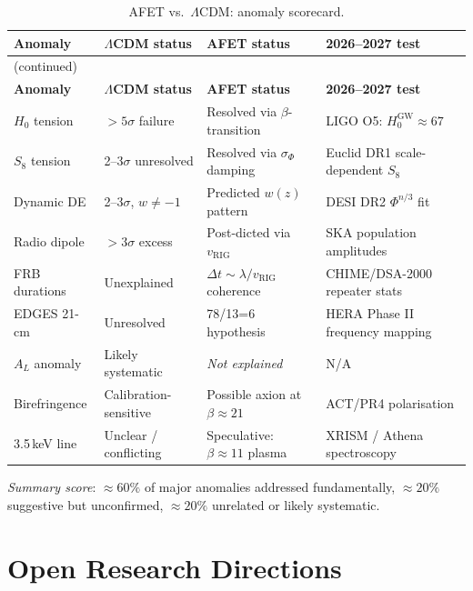 \documentclass[12pt,a4paper]{article}
\theoremstyle{definition}
\newcommand{\sigphi}{\sigma_{\Phi}}
\newcommand{\vrig}{v_{\mathrm{RIG}}}
\newcommand{\PhiAFET}{\Phi}      %
\begin{document}
\begin{longtable}{p{2.4cm}p{2.8cm}p{3.5cm}p{2.8cm}}
\caption{AFET vs.\ $\Lambda$CDM: anomaly scorecard.}
\label{tab:scorecard}\\
\toprule
\textbf{Anomaly} & \textbf{$\Lambda$CDM status} & \textbf{AFET status} &
\textbf{2026--2027 test} \\
\midrule
\endfirsthead
\multicolumn{4}{l}{\small(continued)}\\
\toprule
\textbf{Anomaly} & \textbf{$\Lambda$CDM status} & \textbf{AFET status} &
\textbf{2026--2027 test} \\
\midrule
\endhead
$H_0$ tension & $>5\sigma$ failure &
  \textcolor{confirmgreen}{Resolved via $\beta$-transition} &
  LIGO O5: $H_0^{\mathrm{GW}} \approx 67$ \\[4pt]
$S_8$ tension & 2--3$\sigma$ unresolved &
  \textcolor{confirmgreen}{Resolved via $\sigphi$ damping} &
  Euclid DR1 scale-dependent $S_8$ \\[4pt]
Dynamic DE & 2--3$\sigma$, $w\neq-1$ &
  \textcolor{hypothesisgray}{Predicted $w(z)$ pattern} &
  DESI DR2 $\PhiAFET^{n/3}$ fit \\[4pt]
Radio dipole & $>3\sigma$ excess &
  \textcolor{confirmgreen}{Post-dicted via $\vrig$} &
  SKA population amplitudes \\[4pt]
FRB durations & Unexplained &
  \textcolor{hypothesisgray}{$\Delta t \sim \lambda/\vrig$ coherence} &
  CHIME/DSA-2000 repeater stats \\[4pt]
EDGES 21-cm & Unresolved &
  \textcolor{warningorange}{78/13=6 hypothesis} &
  HERA Phase II frequency mapping \\[4pt]
$A_L$ anomaly & Likely systematic &
  \textit{Not explained} &
  N/A \\[4pt]
Birefringence & Calibration-sensitive &
  \textcolor{warningorange}{Possible axion at $\beta \approx 21$} &
  ACT/PR4 polarisation \\[4pt]
3.5\,keV line & Unclear / conflicting &
  \textcolor{warningorange}{Speculative: $\beta \approx 11$ plasma} &
  XRISM / Athena spectroscopy \\[4pt]
\bottomrule
\end{longtable}

\noindent\textit{Summary score}: $\approx 60\%$ of major anomalies addressed
fundamentally, $\approx 20\%$ suggestive but unconfirmed, $\approx 20\%$
unrelated or likely systematic.

\section{Open Research Directions}
\end{document}
